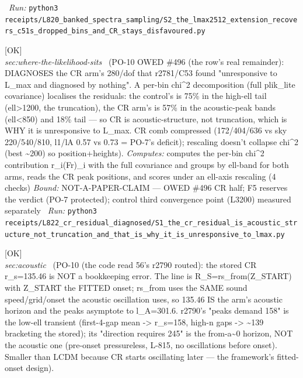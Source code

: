 \begin{description}
\ \emph{Run:} \texttt{python3 receipts/L820\_banked\_spectra\_sampling/S2\_the\_lmax2512\_extension\_recovers\_c51s\_dropped\_bins\_and\_CR\_stays\_disfavoured.py}
\item[\label{rcpt:S1_the_cr_residual_is_acoustic_structure_not_truncation_and_that_is_why_it_is_unresponsive_to_lmax}\textbf{}\quad\texttt{S1\_the\_cr\_residual\_is\_acoustic\_structure\_not\_truncation\_and\_that\_is\_why\_it\_is\_unresponsive\_to\_lmax}]\hfill\textsf{[OK]}\\
\textit{sec:where-the-likelihood-sits} \ (PO-10 OWED \#496 (the row's real remainder): DIAGNOSES the CR arm's 280/dof that r2781/C53 found "unresponsive to L\_max and diagnosed by nothing". A per-bin chi\textasciicircum{}2 decomposition (full plik\_lite covariance) localises the residuals: the control's is 75\% in the high-ell tail (ell>1200, the truncation), the CR arm's is 57\% in the acoustic-peak bands (ell<850) and 18\% tail --- so CR is acoustic-structure, not truncation, which is WHY it is unresponsive to L\_max. CR comb compressed (172/404/636 vs sky 220/540/810, l1/lA 0.57 vs 0.73 = PO-7's deficit); rescaling doesn't collapse chi\textasciicircum{}2 (best \textasciitilde{}200) so position+heights). 
\emph{Computes:} computes the per-bin chi\textasciicircum{}2 contribution r\_i(Fr)\_i with the full covariance and groups by ell-band for both arms, reads the CR peak positions, and scores under an ell-axis rescaling (4 checks)
 \emph{Bound:} NOT-A-PAPER-CLAIM --- OWED \#496 CR half; F5 reserves the verdict (PO-7 protected); control third convergence point (L3200) measured separately
\ \emph{Run:} \texttt{python3 receipts/L822\_cr\_residual\_diagnosed/S1\_the\_cr\_residual\_is\_acoustic\_structure\_not\_truncation\_and\_that\_is\_why\_it\_is\_unresponsive\_to\_lmax.py}
\item[\label{rcpt:S1_the_stored_cr_rs_is_the_from_onset_acoustic_horizon_and_matches_the_arms_own_integral}\textbf{}\quad\texttt{S1\_the\_stored\_cr\_rs\_is\_the\_from\_onset\_acoustic\_horizon\_and\_matches\_the\_arms\_own\_integral}]\hfill\textsf{[OK]}\\
\textit{sec:acoustic} \ (PO-10 (the code read 56's r2790 routed): the stored CR r\_s=135.46 is NOT a bookkeeping error. The line is R\_S=rs\_from(Z\_START) with Z\_START the FITTED onset; rs\_from uses the SAME sound speed/grid/onset the acoustic oscillation uses, so 135.46 IS the arm's acoustic horizon and the peaks asymptote to l\_A=301.6. r2790's "peaks demand 158" is the low-ell transient (first-4-gap mean -> r\_s=158, high-n gaps -> \textasciitilde{}139 bracketing the stored); its "direction requires 245" is the from-a\textasciitilde{}0 horizon, NOT the acoustic one (pre-onset pressureless, L-815, no oscillations before onset). Smaller than LCDM because CR starts oscillating later --- the framework's fitted-onset design). 

\end{description}
